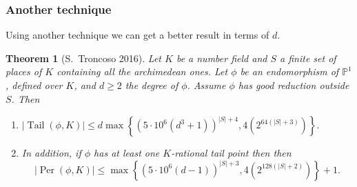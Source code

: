 \documentclass{beamer}
\def\jump{ \quad \\ \vspace{0.7cm} \pause}
\def\PP{{\mathbb P}}
\DeclareMathOperator{\Tail}{Tail}
\DeclareMathOperator{\Per}{Per}
\theoremstyle{thmstyle}
\theoremstyle{thmstyle}
\newtheorem*{mythm}{Theorem}
\theoremstyle{mystyle}
\theoremstyle{qstnstyle}
\begin{document}
%


\begin{frame}
\frametitle{Another technique}

Using another technique we can get a better result in terms of $d$. \pause

\begin{mythm}[S.\ Troncoso 2016]
Let $K$ be a number field and $S$ a finite set of places of $K$ containing all the archimedean ones. Let $\phi $ be an endomorphism of $\PP^1$, defined over $K$, and $d \geq 2$ the degree of $\phi$. Assume $\phi$ has  good reduction outside $S$. Then

\begin{enumerate}

\item [(a)] $|\Tail(\phi,K) | \leq d\max\left\{  (5 \cdot 10^6 (d^3+1))^{|S|+4} ,4(2^{64(|S|+3)}) \right \}.$\jump

\item [(b)] In addition, if $\phi$ has at least one $K$-rational tail point then then
$$|\Per(\phi,K)| \leq   \max \left\{  (5 \cdot 10^6 (d-1))^{|S|+3} ,4(2^{128(|S|+2)}) \right\}+1.$$
\end{enumerate}
\end{mythm}
\end{frame}


%
%
%
%
%
\end{document}
